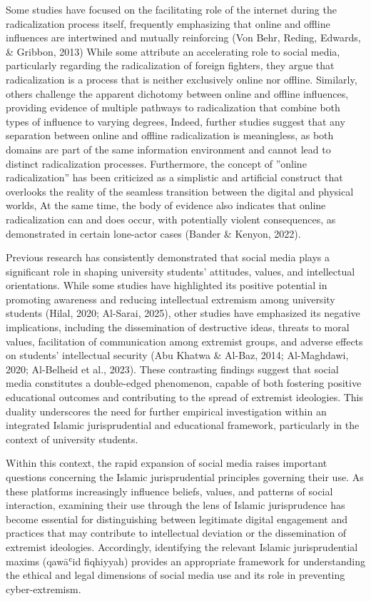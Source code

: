 \documentclass[11pt,a4paper]{article}
\begin{document}
	Some studies have focused on the facilitating role of the internet during the radicalization process itself, frequently emphasizing that online and offline influences are intertwined and mutually reinforcing (Von Behr, Reding, Edwards, \& Gribbon, 2013) While some attribute an accelerating role to social media, particularly regarding the radicalization of foreign fighters, they argue that radicalization is a process that is neither exclusively online nor offline. Similarly, others challenge the apparent dichotomy between online and offline influences, providing evidence of multiple pathways to radicalization that combine both types of influence to varying degrees, Indeed, further studies suggest that any separation between online and offline radicalization is meaningless, as both domains are part of the same information environment and cannot lead to distinct radicalization processes. Furthermore, the concept of ''online radicalization'' has been criticized as a simplistic and artificial construct that overlooks the reality of the seamless transition between the digital and physical worlds, At the same time, the body of evidence also indicates that online radicalization can and does occur, with potentially violent consequences, as demonstrated in certain lone-actor cases (Bander \& Kenyon, 2022).
	
	Previous research has consistently demonstrated that social media plays a significant role in shaping university students' attitudes, values, and intellectual orientations. While some studies have highlighted its positive potential in promoting awareness and reducing intellectual extremism among university students (Hilal, 2020; Al-Sarai, 2025), other studies have emphasized its negative implications, including the dissemination of destructive ideas, threats to moral values, facilitation of communication among extremist groups, and adverse effects on students' intellectual security (Abu Khatwa \& Al-Baz, 2014; Al-Maghdawi, 2020; Al-Belheid et al., 2023). These contrasting findings suggest that social media constitutes a double-edged phenomenon, capable of both fostering positive educational outcomes and contributing to the spread of extremist ideologies. This duality underscores the need for further empirical investigation within an integrated Islamic jurisprudential and educational framework, particularly in the context of university students.
	
	Within this context, the rapid expansion of social media raises important questions concerning the Islamic jurisprudential principles governing their use. As these platforms increasingly influence beliefs, values, and patterns of social interaction, examining their use through the lens of Islamic jurisprudence has become essential for distinguishing between legitimate digital engagement and practices that may contribute to intellectual deviation or the dissemination of extremist ideologies. Accordingly, identifying the relevant Islamic jurisprudential maxims (qawāʿid fiqhiyyah) provides an appropriate framework for understanding the ethical and legal dimensions of social media use and its role in preventing cyber-extremism.
	
\end{document}
